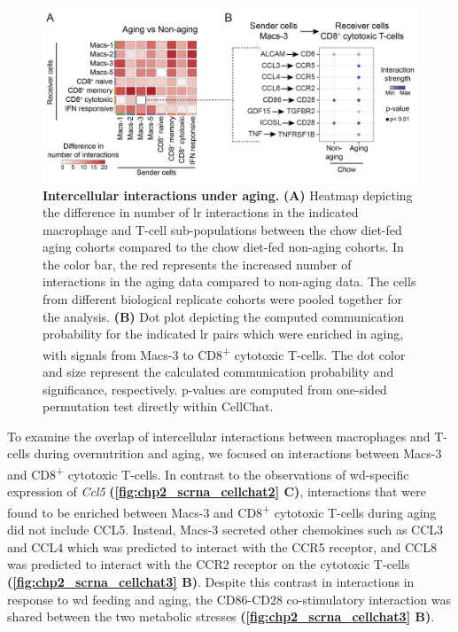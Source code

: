 \begin{figure}[b!]
\centering
\includegraphics[width=\linewidth]{Chapter4/Fig/F2-A1-v3-02.png}
\caption[Intercellular interactions under aging]{\textbf{Intercellular interactions under aging.}
\textbf{(A)} Heatmap depicting the difference in number of \gls{lr} interactions in the indicated macrophage and T-cell sub-populations between the chow diet-fed aging cohorts compared to the chow diet-fed non-aging cohorts. In the color bar, the red represents the increased number of interactions in the aging data compared to non-aging data. The cells from different biological replicate cohorts were pooled together for the analysis. \textbf{(B)} Dot plot depicting the computed communication probability for the indicated \gls{lr} pairs which were enriched in aging, with signals from Macs-3 to CD8\textsuperscript{+}  cytotoxic T-cells. The dot color and size represent the calculated communication probability and significance, respectively. p-values are computed from one-sided permutation test directly within CellChat.}
\label{fig:chp2_scrna_cellchat3}
\end{figure}

\par To examine the overlap of intercellular interactions between macrophages and T-cells during overnutrition and aging, we focused on interactions between Macs-3 and CD8\textsuperscript{+} cytotoxic T-cells. In contrast to the observations of \gls{wd}-specific expression of \textit{Ccl5} \textbf{(\autoref{fig:chp2_scrna_cellchat2} C)}, interactions that were found to be enriched between Macs-3 and CD8\textsuperscript{+} cytotoxic T-cells during aging did not include CCL5. Instead, Macs-3 secreted other chemokines such as CCL3 and CCL4 which was predicted to interact with the CCR5 receptor, and CCL8 was predicted to interact with the CCR2 receptor on the cytotoxic T-cells \textbf{(\autoref{fig:chp2_scrna_cellchat3} B)}. Despite this contrast in interactions in response to \gls{wd} feeding and aging, the CD86-CD28 co-stimulatory interaction was shared between the two metabolic stresses \textbf{(\autoref{fig:chp2_scrna_cellchat3} B)}.\\

